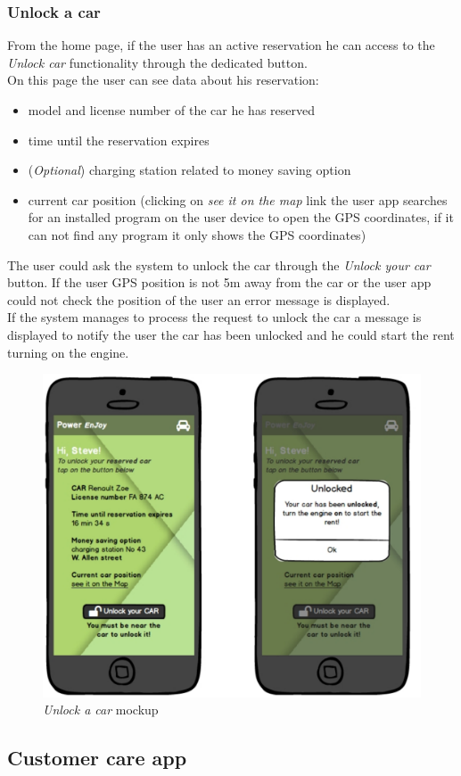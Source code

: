 \subsubsection{Unlock a car}

From the home page, if the user has an active reservation he can access to the \emph{Unlock car} functionality through the dedicated button. \\

On this page the user can see data about his reservation:
\begin{itemize}
	\item model and license number of the car he has reserved
	\item time until the reservation expires
	\item (\emph{Optional}) charging station related to money saving
	 option
	\item  current car position (clicking on \emph{see it on the map} link the user app searches for an installed program on the user device to open the GPS coordinates, if it can not find any program it only shows the GPS coordinates)
\end{itemize}

The user could ask the system to unlock the car through the \emph{Unlock your car} button. If the user GPS position is not 5m away from the car or the user app could not check the position of the user an error message is displayed. \\

If the system manages to process the request to unlock the car a message is displayed to notify the user the car has been unlocked and he could start the rent turning on the engine.\\

\begin{figure}[h]
			\centering
			\includegraphics[width=0.9\linewidth]{mockups/unlockCar}
			\caption{
				\label{fig:unlockCar} 
				\emph{Unlock a car} mockup
			}
		\end{figure}
		
\subsection{Customer care app}
